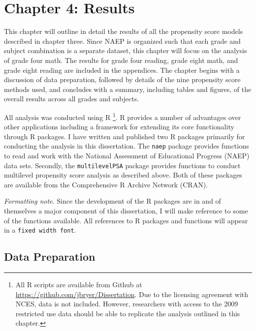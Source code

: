 \documentclass[letterpaper,12p,twoside]{article} %
\begin{document}
\cleardoublepage
\section{Chapter 4: Results}

This chapter will outline in detail the results of all the propensity score models described in chapter three. Since NAEP is organized such that each grade and subject combination is a separate dataset, this chapter will focus on the analysis of grade four math. The results for grade four reading, grade eight math, and grade eight reading are included in the appendices. The chapter begins with a discussion of data preparation, followed by details of the nine propensity score methods used, and concludes with a summary, including tables and figures, of the overall results across all grades and subjects.

All analysis was conducted using R \cite{rdevelopment}\footnote{All R scripts are available from Github at \url{https://github.com/jbryer/Dissertation}. Due to the licensing agreement with NCES, data is not included. However, researchers with access to the 2009 restricted use data should be able to replicate the analysis outlined in this chapter.}. R provides a number of advantages over other applications including a framework for extending its core functionality through R packages. I have written and published two R packages primarily for conducting the analysis in this dissertation. The \texttt{naep} package provides functions to read and work with the National Assessment of Educational Progress (NAEP) data sets. Secondly, the \texttt{multilevelPSA} package provides functions to conduct multilevel propensity score analysis as described above. Both of these packages are available from the Comprehensive R Archive Network (CRAN). 


\textit{Formatting note}. Since the development of the R packages are in and of themselves a major component of this dissertation, I will make reference to some of the functions available. All references to R packages and functions will appear in a \texttt{fixed width font}.

\subsection{Data Preparation}
\end{document}
